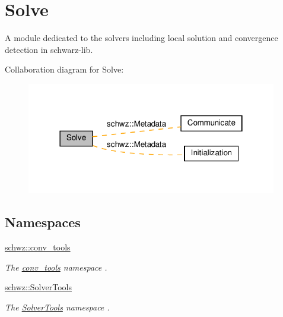 \hypertarget{group__solve}{}\section{Solve}
\label{group__solve}


A module dedicated to the solvers including local solution and convergence detection in schwarz-\/lib.  


Collaboration diagram for Solve\+:
\nopagebreak
\begin{figure}[H]
\begin{center}
\leavevmode
\includegraphics[width=310pt]{group__solve}
\end{center}
\end{figure}
\subsection*{Namespaces}
\begin{DoxyCompactItemize}
\item 
 \hyperlink{namespaceschwz_1_1conv__tools}{schwz\+::conv\+\_\+tools}
\begin{DoxyCompactList}\small\item\em The \hyperlink{namespaceschwz_1_1conv__tools}{conv\+\_\+tools} namespace . \end{DoxyCompactList}\item 
 \hyperlink{namespaceschwz_1_1SolverTools}{schwz\+::\+Solver\+Tools}
\begin{DoxyCompactList}\small\item\em The \hyperlink{namespaceschwz_1_1SolverTools}{Solver\+Tools} namespace . \end{DoxyCompactList}\end{DoxyCompactItemize}
